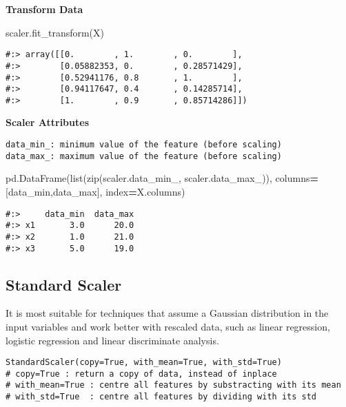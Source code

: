 \documentclass[
]{book}
\newenvironment{Shaded}{\begin{snugshade}}{\end{snugshade}}
\newcommand{\BuiltInTok}[1]{#1}
\newcommand{\NormalTok}[1]{#1}
\newcommand{\OperatorTok}[1]{\textcolor[rgb]{0.43,0.43,0.43}{\textbf{#1}}}
\newcommand{\StringTok}[1]{\textcolor[rgb]{0.5,0.5,0.5}{#1}}
\begin{document}
\textbf{Transform Data}

\begin{Shaded}
\begin{Highlighting}[]
\NormalTok{scaler.fit\_transform(X)}
\end{Highlighting}
\end{Shaded}

\begin{verbatim}
#:> array([[0.        , 1.        , 0.        ],
#:>        [0.05882353, 0.        , 0.28571429],
#:>        [0.52941176, 0.8       , 1.        ],
#:>        [0.94117647, 0.4       , 0.14285714],
#:>        [1.        , 0.9       , 0.85714286]])
\end{verbatim}

\textbf{Scaler Attributes}

\begin{verbatim}
data_min_: minimum value of the feature (before scaling)  
data_max_: maximum value of the feature (before scaling)  
\end{verbatim}

\begin{Shaded}
\begin{Highlighting}[]
\NormalTok{pd.DataFrame(}\BuiltInTok{list}\NormalTok{(}\BuiltInTok{zip}\NormalTok{(scaler.data\_min\_, scaler.data\_max\_)), }
\NormalTok{             columns}\OperatorTok{=}\NormalTok{[}\StringTok{\textquotesingle{}data\_min\textquotesingle{}}\NormalTok{,}\StringTok{\textquotesingle{}data\_max\textquotesingle{}}\NormalTok{], }
\NormalTok{             index}\OperatorTok{=}\NormalTok{X.columns)}
\end{Highlighting}
\end{Shaded}

\begin{verbatim}
#:>     data_min  data_max
#:> x1       3.0      20.0
#:> x2       1.0      21.0
#:> x3       5.0      19.0
\end{verbatim}

\hypertarget{standard-scaler}{%
\subsection{Standard Scaler}\label{standard-scaler}}

It is most suitable for techniques that assume a Gaussian distribution in the input variables and work better with rescaled data, such as linear regression, logistic regression and linear discriminate analysis.

\begin{verbatim}
StandardScaler(copy=True, with_mean=True, with_std=True)
# copy=True : return a copy of data, instead of inplace
# with_mean=True : centre all features by substracting with its mean
# with_std=True  : centre all features by dividing with its std
\end{verbatim}
\end{document}

